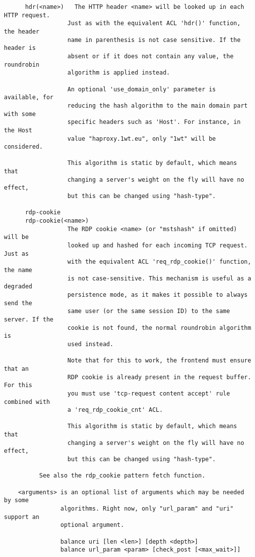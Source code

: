 \begin{verbatim}
      hdr(<name>)   The HTTP header <name> will be looked up in each HTTP request.
                  Just as with the equivalent ACL 'hdr()' function, the header
                  name in parenthesis is not case sensitive. If the header is
                  absent or if it does not contain any value, the roundrobin
                  algorithm is applied instead.

                  An optional 'use_domain_only' parameter is available, for
                  reducing the hash algorithm to the main domain part with some
                  specific headers such as 'Host'. For instance, in the Host
                  value "haproxy.1wt.eu", only "1wt" will be considered.

                  This algorithm is static by default, which means that
                  changing a server's weight on the fly will have no effect,
                  but this can be changed using "hash-type".

      rdp-cookie
      rdp-cookie(<name>)
                  The RDP cookie <name> (or "mstshash" if omitted) will be
                  looked up and hashed for each incoming TCP request. Just as
                  with the equivalent ACL 'req_rdp_cookie()' function, the name
                  is not case-sensitive. This mechanism is useful as a degraded
                  persistence mode, as it makes it possible to always send the
                  same user (or the same session ID) to the same server. If the
                  cookie is not found, the normal roundrobin algorithm is
                  used instead.

                  Note that for this to work, the frontend must ensure that an
                  RDP cookie is already present in the request buffer. For this
                  you must use 'tcp-request content accept' rule combined with
                  a 'req_rdp_cookie_cnt' ACL.

                  This algorithm is static by default, which means that
                  changing a server's weight on the fly will have no effect,
                  but this can be changed using "hash-type".

		  See also the rdp_cookie pattern fetch function.

    <arguments> is an optional list of arguments which may be needed by some
                algorithms. Right now, only "url_param" and "uri" support an
                optional argument.

                balance uri [len <len>] [depth <depth>]
                balance url_param <param> [check_post [<max_wait>]]


\end{verbatim}
